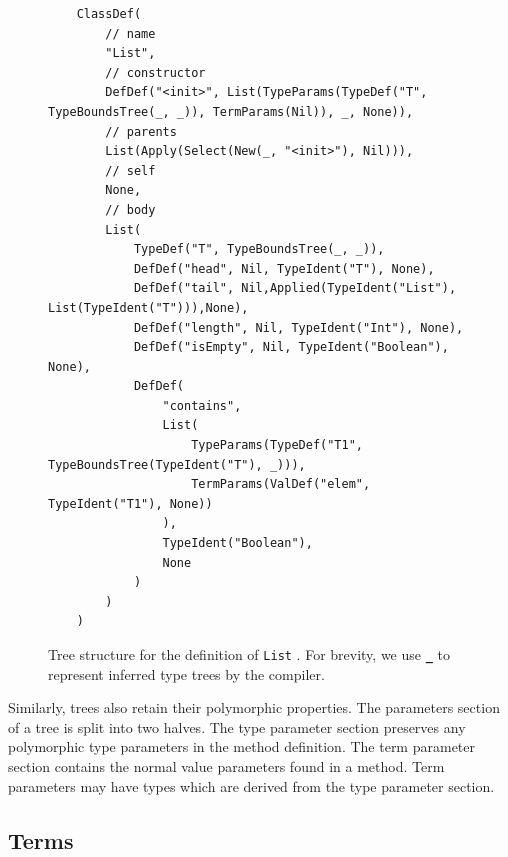 \begin{figure}[!htb]
	\begin{verbatim}
	ClassDef(
		// name 
		"List",
		// constructor
		DefDef("<init>", List(TypeParams(TypeDef("T", TypeBoundsTree(_, _)), TermParams(Nil)), _, None)),
		// parents
		List(Apply(Select(New(_, "<init>"), Nil))),
		// self
		None,
		// body
		List(
			TypeDef("T", TypeBoundsTree(_, _)),
			DefDef("head", Nil, TypeIdent("T"), None),
			DefDef("tail", Nil,Applied(TypeIdent("List"), List(TypeIdent("T"))),None),
			DefDef("length", Nil, TypeIdent("Int"), None),
			DefDef("isEmpty", Nil, TypeIdent("Boolean"), None),
			DefDef(
				"contains",
				List(
					TypeParams(TypeDef("T1", TypeBoundsTree(TypeIdent("T"), _))),
					TermParams(ValDef("elem", TypeIdent("T1"), None))
				),
				TypeIdent("Boolean"),
				None
			)
		)
	)
	\end{verbatim} 
	\caption{Tree structure for the definition of \texttt{List} . For brevity, we use \textbf{\texttt{\_}} to represent inferred\cite{ml:type-inference} type trees by the compiler.}
	\label{tasty:list}
\end{figure}

Similarly,  trees also retain their polymorphic properties.
The parameters section of a  tree is split into two halves.
The type parameter section preserves any polymorphic type parameters in the method definition.
The term parameter section contains the normal value parameters found in a method.
Term parameters may have types which are derived from the type parameter section.

\subsection{Terms}
\label{section:tasty:terms}

